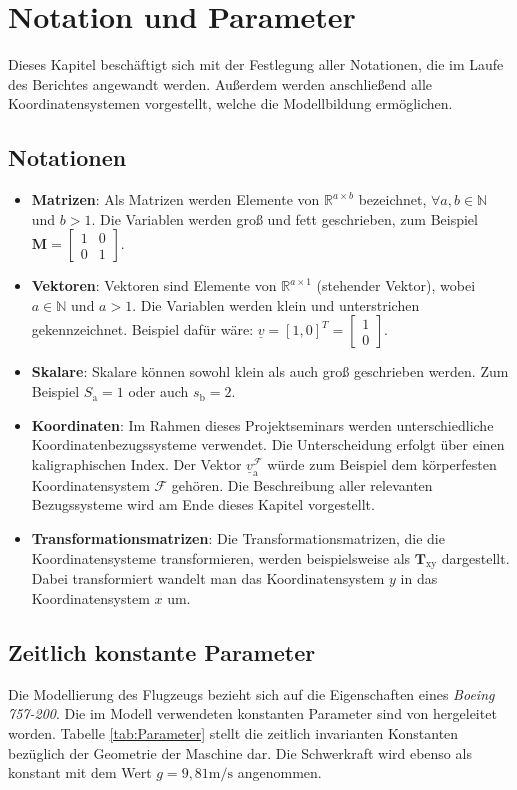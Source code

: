 \chapter{Notation und Parameter}\label{cha:Notation}

Dieses Kapitel beschäftigt sich mit der Festlegung aller Notationen, die im Laufe des Berichtes angewandt werden. Außerdem werden anschließend alle Koordinatensystemen vorgestellt, welche die Modellbildung ermöglichen.

\section{Notationen}
\begin{itemize}
\item \textbf{Matrizen}: Als Matrizen werden Elemente von $\mathbb{R}^{a\times b}$ bezeichnet, $\forall a,b \in \mathbb{N}$ und $b>1$. Die Variablen werden groß und fett geschrieben, zum Beispiel $\textbf{M} = \begin{bmatrix} 
1 & 0\\
0 & 1
\end{bmatrix}$.
\item \textbf{Vektoren}: Vektoren sind Elemente von $\mathbb{R}^{a\times 1}$ (stehender Vektor), wobei $a \in \mathbb{N}$ und $a>1$. Die Variablen werden klein und unterstrichen gekennzeichnet. Beispiel dafür wäre: $\underline{v} = [1,0]^T = \begin{bmatrix} 
1 \\
0 
\end{bmatrix}$.
\item \textbf{Skalare}: Skalare können sowohl klein als auch groß geschrieben werden. Zum Beispiel $S_\mathrm{a} = 1$ oder auch $s_\mathrm{b} = 2$.
\item \textbf{Koordinaten}: Im Rahmen dieses Projektseminars werden unterschiedliche Koordinatenbezugssysteme verwendet. Die Unterscheidung erfolgt über einen kaligraphischen Index. Der Vektor $\underline{v}_\mathrm{a}^\mathcal{F}$ würde zum Beispiel dem körperfesten Koordinatensystem $\mathcal{F}$ gehören. Die Beschreibung aller relevanten Bezugssysteme wird am Ende dieses Kapitel vorgestellt.
\item \textbf{Transformationsmatrizen}: Die Transformationsmatrizen, die die Koordinatensysteme transformieren, werden beispielsweise als $\textbf{T}_\mathrm{xy}$  dargestellt. Dabei transformiert wandelt man das Koordinatensystem $y$ in das Koordinatensystem $x$ um.
\end{itemize}
\section{Zeitlich konstante Parameter}
Die Modellierung des Flugzeugs bezieht sich auf die Eigenschaften eines \textit{Boeing 757-200}. Die im Modell verwendeten konstanten Parameter sind von \cite{B7571, B7572,RAMPaper} hergeleitet worden. Tabelle \ref{tab:Parameter} stellt die zeitlich invarianten Konstanten bezüglich der Geometrie der Maschine dar. Die Schwerkraft wird ebenso als konstant mit dem Wert $g = 9,81 \mathrm{m/s}$ angenommen.

